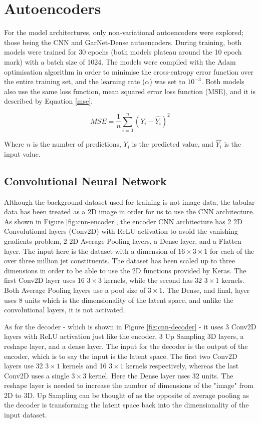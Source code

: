 \documentclass[a4paper]{article}
\theoremstyle{plain}
\theoremstyle{definition}
\begin{document}
	\section{Autoencoders}
	\label{section:autoencoders}

		For the model architectures, only non-variational autoencoders were explored; those being the CNN and GarNet-Dense autoencoders. During training, both models were trained for 30 epochs (both models plateau around the 10 epoch mark) with a batch size of 1024. The models were compiled with the Adam optimisation algorithm \cite{adam} in order to minimise the cross-entropy error function over the entire training set, and the learning rate ($\alpha$) was set to $10^{-3}$. Both models also use the same loss function, mean squared error loss function (MSE), and it is described by Equation \ref{mse}.

		\begin{equation}\label{mse}
			MSE =  \frac{1}{n} \sum_{i=0}^{n} (Y_i - \hat{Y_i})^2
		\end{equation}

		Where $n$ is the number of predictions, $Y_i$ is the predicted value, and $\hat{Y_i}$ is the input value.

		\subsection{Convolutional Neural Network}

			Although the background dataset used for training is not image data, the tabular data has been treated as a 2D image in order for us to use the CNN architecture. As shown in Figure \ref{fig:cnn-encoder}, the encoder CNN architecture has 2 2D Convolutional layers (Conv2D) with ReLU activation to avoid the vanishing gradients problem, 2 2D Average Pooling layers, a Dense layer, and a Flatten layer. The input here is the dataset with a dimension of $16 \times 3 \times 1$ for each of the over three million jet constituents. The dataset has been scaled up to three dimensions in order to be able to use the 2D functions provided by Keras. The first Conv2D layer uses 16 $3 \times 3$ kernels, while the second has 32 $3 \times 1$ kernels. Both Average Pooling layers use a pool size of $3 \times 1$. The Dense, and final, layer uses 8 units which is the dimensionality of the latent space, and unlike the convolutional layers, it is not activated.

			As for the decoder - which is shown in Figure \ref{fig:cnn-decoder} - it uses 3 Conv2D layers with ReLU activation just like the encoder, 3 Up Sampling 3D layers, a reshape layer, and a dense layer. The input for the decoder is the output of the encoder, which is to say the input is the latent space. The first two Conv2D layers use 32 $3 \times 1$ kernels and 16 $3 \times 1$ kernels respectively, whereas the last Conv2D uses a single $3 \times 3$ kernel. Here the Dense layer uses 32 units. The reshape layer is needed to increase the number of dimensions of the "image" from 2D to 3D. Up Sampling can be thought of as the opposite of average pooling as the decoder is transforming the latent space back into the dimensionality of the input dataset.
\end{document}
